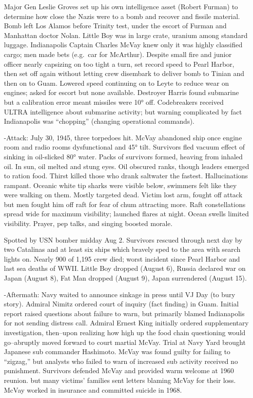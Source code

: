 \documentclass[
]{article}
\begin{document}
Major Gen Leslie Groves set up his own intelligence asset (Robert
Furman) to determine how close the Nazis were to a bomb and recover and
fissile material. Bomb left Los Alamos before Trinity test, under the
escort of Furman and Manhattan doctor Nolan. Little Boy was in large
crate, uranium among standard luggage. Indianapolis Captain Charles
McVay knew only it was highly classified cargo; men made bets (e.g.~car
for McArthur). Despite small fire and junior officer nearly capsizing on
too tight a turn, set record speed to Pearl Harbor, then set off again
without letting crew disembark to deliver bomb to Tinian and then on to
Guam. Lowered speed continuing on to Leyte to reduce wear on engines;
asked for escort but none available. Destroyer Harris found submarine
but a calibration error meant missiles were 10° off. Codebreakers
received ULTRA intelligence about submarine activity; but warning
complicated by fact Indianapolis was ``chopping'' (changing operational
commands).

-Attack: July 30, 1945, three torpedoes hit. McVay abandoned ship once
engine room and radio rooms dysfunctional and 45° tilt. Survivors fled
vacuum effect of sinking in oil-slicked 80° water. Packs of survivors
formed, heaving from inhaled oil. In sun, oil melted and stung eyes. Oil
obscured ranks, though leaders emerged to ration food. Thirst killed
those who drank saltwater the fastest. Hallucinations rampant. Oceanic
white tip sharks were visible below, swimmers felt like they were
walking on them. Mostly targeted dead. Victim lost arm, fought off
attack but men fought him off raft for fear of chum attracting more.
Raft constellations spread wide for maximum visibility; launched flares
at night. Ocean swells limited visibility. Prayer, pep talks, and
singing boosted morale.

Spotted by USN bomber midday Aug 2. Survivors rescued through next day
by two Catalinas and at least six ships which bravely sped to the area
with search lights on. Nearly 900 of 1,195 crew died; worst incident
since Pearl Harbor and last sea deaths of WWII. Little Boy dropped
(August 6), Russia declared war on Japan (August 8), Fat Man dropped
(August 9), Japan surrendered (August 15).

-Aftermath: Navy waited to announce sinkage in press until VJ Day (to
bury story). Admiral Nimitz ordered court of inquiry (fact finding) in
Guam. Initial report raised questions about failure to warn, but
primarily blamed Indianapolis for not sending distress call. Admiral
Ernest King initially ordered supplementary investigation, then--upon
realizing how high up the food chain questioning would go--abruptly
moved forward to court martial McVay. Trial at Navy Yard brought
Japanese sub commander Hashimoto. McVay was found guilty for failing to
``zigzag,'' but analysts who failed to warn of increased sub activity
received no punishment. Survivors defended McVay and provided warm
welcome at 1960 reunion. but many victims' families sent letters blaming
McVay for their loss. McVay worked in insurance and committed suicide in
1968.
\end{document}
